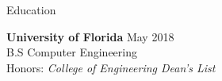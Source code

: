 \documentclass{resume} %
\begin{document}

\begin{rSection}{Education}

{\bf University of Florida} \hfill {May 2018} 
\\ B.S Computer Engineering
\\ Honors: \textit{College of Engineering Dean's List}  

\end{rSection}

\end{document}

